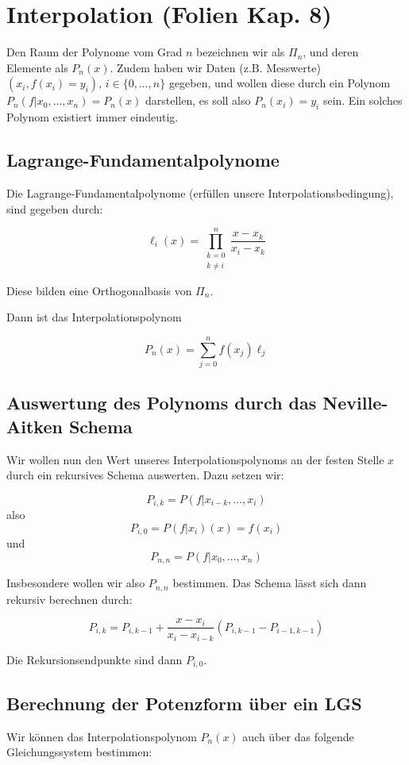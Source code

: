 \documentclass[a4paper,parskip=half*,DIV=7,fontsize=11pt]{scrartcl}
\begin{document}
\section{Interpolation (Folien Kap. 8)}
Den Raum der Polynome vom Grad $n$ bezeichnen wir als $\Pi_n$, und deren Elemente als $P_n (x)$. Zudem haben wir Daten (z.B. Messwerte) $(x_i,f(x_i) = y_i),\, i \in \{0,\ldots,n\}$ gegeben, und wollen diese durch ein Polynom $P_n (f|x_0,\ldots, x_n) = P_n (x)$ darstellen, es soll also $P_n (x_i) = y_i$ sein. Ein solches Polynom existiert immer eindeutig. 

\subsection{Lagrange-Fundamentalpolynome}
Die Lagrange-Fundamentalpolynome (erfüllen unsere Interpolationsbedingung), sind gegeben durch:

\[\ell_i(x) = \prod_{\substack{k = 0 \\ k \neq i}}^n \frac{x - x_k}{x_i - x_k}\]

Diese bilden eine Orthogonalbasis von $\Pi_n$.

Dann ist das Interpolationspolynom

\[P_n (x) = \sum_{j=0}^n f (x_j) \ell_j\]

\subsection{Auswertung des Polynoms durch das Neville-Aitken Schema}
Wir wollen nun den Wert unseres Interpolationspolynoms an der festen Stelle $x$ durch ein rekursives Schema auswerten. Dazu setzen wir:

\[P_{i,k} = P(f|x_{i-k},\ldots,x_i)\]
also
\[P_{i,0} = P(f|x_i)(x) = f(x_i)\]
und
\[P_{n,n} = P(f|x_0,\ldots,x_n)\]

Insbesondere wollen wir also $P_{n,n}$ bestimmen. Das Schema lässt sich dann rekursiv berechnen durch:

\[P_{i,k} = P_{i,k-1} + \frac{x - x_i}{x_i - x_{i-k}} (P_{i,k-1} - P_{i-1,k-1})\]

Die Rekursionsendpunkte sind dann $P_{i,0}$.

\subsection{Berechnung der Potenzform über ein LGS}
Wir können das Interpolationspolynom $P_n(x)$ auch über das folgende Gleichungssystem bestimmen:
\end{document}
